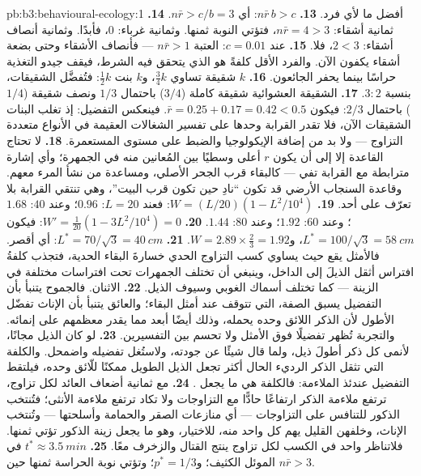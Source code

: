 \begin{solution}{pb:b3:behavioural-ecology:1}
أفضل ما لأي فرد.
\textbf{13.} $n\bar r\,b > c$: أي $n\bar r > c/b = 3$.
\textbf{14.} ثمانية أشقاء: $n\bar r = 4 > 3$، فتؤتي النوبة ثمنها. وثمانية
غرباء: $0$، فأبدًا. وثمانية أنصاف أشقاء: $2 < 3$، فلا.
\textbf{15.} عند $c = 0.01$: العتبة $n\bar r > 1$ --- فأنصاف الأشقاء
وحتى بضعة أشقاء يكفون الآن. والفرد الأقل كلفةً هو الذي
يتحقق فيه الشرط، فيقف جيدو التغذية حراسًا بينما يحفر
الجائعون.
\textbf{16.} $k$ شقيقة تساوي $\tfrac{3}{4}k$، و$k$ بنت
$\tfrac{1}{2}k$: فتُفضَّل الشقيقات، بنسبة $3{:}2$.
\textbf{17.} الشقيقة العشوائية شقيقة كاملة ($3/4$) باحتمال
$1/3$ ونصف شقيقة ($1/4$) باحتمال $2/3$: فيكون $\bar r = 0.25 +
0.17 = 0.42 < 0.5$. فينعكس التفضيل: إذ تغلب البنات الشقيقات الآن،
فلا تقدر القرابة وحدها على تفسير الشغالات العقيمة في الأنواع
متعددة التزاوج --- ولا بد من إضافة الإيكولوجيا والضبط على مستوى المستعمرة.
\textbf{18.} لا تحتاج القاعدة إلا إلى أن يكون $r$ أعلى وسطيًا بين
المُعانين منه في الجمهرة؛ وأي إشارة مترابطة مع القرابة
تفي --- كالبقاء قرب الجحر الأصلي، ومساعدة من نشأ المرء معهم.
وقاعدة السنجاب الأرضي قد تكون ``نادِ حين تكون قرب البيت''، وهي تنتقي
القرابة بلا تعرّف على أحد.
\textbf{19.} $W = (L/20)(1 - L^{2}/10^{4})$: فعند $L = 20$: $0.96$؛ وعند $40$:
$1.68$؛ وعند $60$: $1.92$؛ وعند $80$: $1.44$.
\textbf{20.} $W' = \tfrac{1}{20}(1 - 3L^{2}/10^{4}) = 0$: فيكون $L^{*} = 100/\sqrt{3}
= \qty{58}{cm}$، و$W = 2.89\times\tfrac{2}{3} = 1.92$.
\textbf{21.} $L^{*} = 70/\sqrt{3} = \qty{40}{cm}$: أي أقصر. فالأمثل
يقع حيث يساوي كسب التزاوج الحدي خسارةَ البقاء الحدية،
فتجذب كلفةُ افتراس أثقل الذيلَ إلى الداخل، وينبغي أن تختلف
الجمهرات تحت افتراسات مختلفة في الزينة --- كما تختلف أسماك
الغوبي وسيوف الذيل.
\textbf{22.} الاثنان. فالجموح يتنبأ بأن التفضيل يسبق الصفة،
التي تتوقف عند أمثل البقاء؛ والعائق يتنبأ بأن الإناث تفضّل
الأطول لأن الذكر اللائق وحده يحمله، وذلك أيضًا أبعد مما يقدر
معظمهم على إنمائه. والتجربة تُظهر تفضيلًا فوق الأمثل ولا
تحسم بين التفسيرين.
\textbf{23.} لو كان الذيل مجانًا، لأنمى كل ذكر أطولَ ذيل،
ولما قال شيئًا عن جودته، ولاستُغل تفضيله واضمحل.
والكلفة التي تثقل الذكر الرديء الحال أكثر تجعل الذيل الطويل
ممكنًا للّائق وحده، فيلتقط التفضيل عندئذ الملاءمة: فالكلفة هي
ما يجعل .
\textbf{24.} مع ثمانية أضعاف العائد لكل تزاوج، ترتفع ملاءمة
الذكر ارتفاعًا حادًّا مع التزاوجات ولا تكاد ترتفع ملاءمة
الأنثى؛ فتُنتخب الذكور للتنافس على التزاوجات --- أي منازعات
الصقر والحمامة وأسلحتها --- وتُنتخب الإناث، وخلفهن القليل
يهم كل واحد منه، للاختيار، وهو ما يجعل زينة الذكور تؤتي
ثمنها. فلاتناظر واحد في الكسب لكل تزاوج ينتج القتال والزخرف معًا.
\textbf{25.} $t^{*} \approx \qty{3.5}{min}$ في الموئل الكثيف؛ و$p^{*}
= 1/3$؛ وتؤتي نوبة الحراسة ثمنها حين $n\bar r > 3$.
\end{solution}
